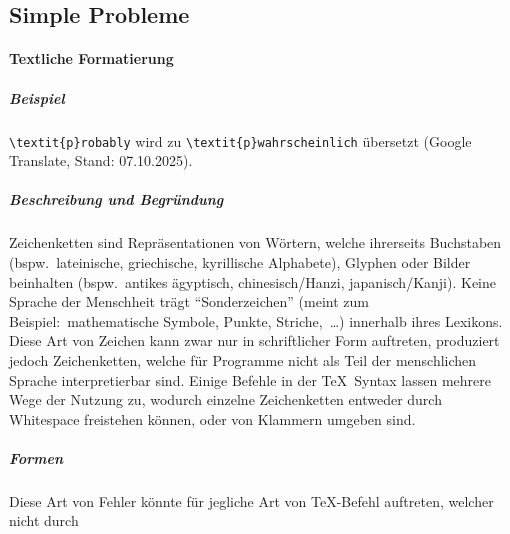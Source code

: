 \subsection{Simple Probleme}
\paragraph*{Textliche Formatierung}%
\subparagraph*{Beispiel}
\verb|\textit{p}robably| wird zu \verb|\textit{p}wahrscheinlich| übersetzt (Google Translate, Stand: 07.10.2025).
\subparagraph*{Beschreibung und Begründung}
Zeichenketten sind Repräsentationen von Wörtern, welche ihrerseits Buchstaben (bspw.\ lateinische, griechische, kyrillische Alphabete), Glyphen oder Bilder beinhalten (bspw.\ antikes ägyptisch, chinesisch/Hanzi, japanisch/Kanji). Keine Sprache der Menschheit trägt \enquote{Sonderzeichen} (meint zum Beispiel:\ mathematische Symbole, Punkte, Striche,\ \ldots) innerhalb ihres Lexikons. Diese Art von Zeichen kann zwar nur in schriftlicher Form auftreten, produziert jedoch Zeichenketten, welche für Programme nicht als Teil der menschlichen Sprache interpretierbar sind. Einige Befehle in der \TeX{}~Syntax lassen mehrere Wege der Nutzung zu, wodurch einzelne Zeichenketten entweder durch Whitespace freistehen können, oder von Klammern umgeben sind.
\subparagraph*{Formen}%
Diese Art von Fehler könnte für jegliche Art von \TeX{}-Befehl auftreten, welcher nicht durch 




